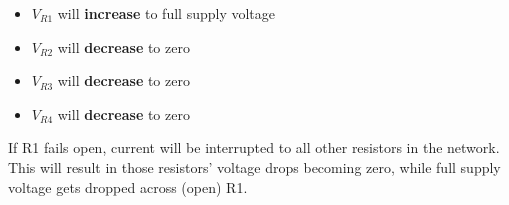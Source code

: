 
\begin{itemize}
\item{} $V_{R1}$ will {\bf increase} to full supply voltage
\vskip 10pt
\item{} $V_{R2}$ will {\bf decrease} to zero
\vskip 10pt
\item{} $V_{R3}$ will {\bf decrease} to zero
\vskip 10pt
\item{} $V_{R4}$ will {\bf decrease} to zero
\end{itemize}

If R1 fails open, current will be interrupted to all other resistors in the network.  This will result in those resistors' voltage drops becoming zero, while full supply voltage gets dropped across (open) R1.




